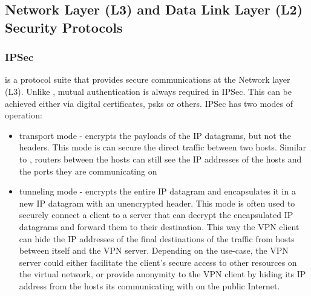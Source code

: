 \hypertarget{network-layer-l3-and-data-link-layer-l2-security-protocols}{%
\subsection{Network Layer (L3) and Data Link Layer (L2) Security
Protocols}\label{network-layer-l3-and-data-link-layer-l2-security-protocols}}

\hypertarget{ipsec}{%
\subsubsection{IPSec}\label{ipsec}}

 is a protocol suite that provides secure
communications at the Network layer (L3). Unlike ,
mutual authentication is always required in IPSec. This can be achieved
either via digital certificates, \glspl{psk} or others. IPSec has two
modes of operation:

\begin{itemize}
\tightlist
\item
  transport mode - encrypts the payloads of the IP datagrams, but not
  the headers. This mode is can secure the direct traffic between two
  hosts. Similar to , routers between the hosts can
  still see the IP addresses of the hosts and the ports they are
  communicating on
\item
  tunneling mode - encrypts the entire IP datagram and encapsulates it
  in a new IP datagram with an unencrypted header. This mode is often
  used to securely connect a  client to a server that
  can decrypt the encapsulated IP datagrams and forward them to their
  destination. This way the VPN client can hide the IP addresses of the
  final destinations of the traffic from hosts between itself and the
  VPN server. Depending on the use-case, the VPN server could either
  facilitate the client's secure access to other resources on the
  virtual network, or provide anonymity to the VPN client by hiding its
  IP address from the hosts its communicating with on the public
  Internet.
\end{itemize}


